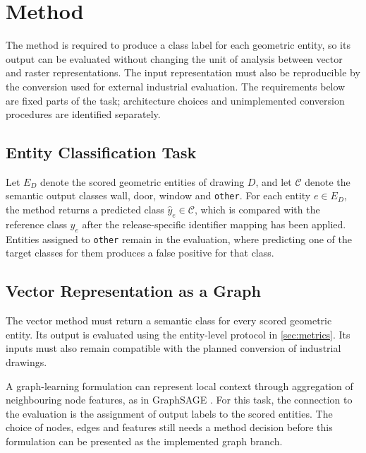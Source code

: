 \chapter{Method}
\label{ch:method}

The method is required to produce a class label for each geometric entity, so its
output can be evaluated without changing the unit of analysis between vector and
raster representations.
The input representation must also be reproducible by the conversion used for
external industrial evaluation.
The requirements below are fixed parts of the task; architecture choices and
unimplemented conversion procedures are identified separately.

\section{Entity Classification Task}
\label{sec:entity-task}
Let \(E_D\) denote the scored geometric entities of drawing \(D\), and let
\(\mathcal{C}\) denote the semantic output classes wall, door, window and
\texttt{other}.
For each entity \(e\in E_D\), the method returns a predicted class
\(\hat y_e\in\mathcal{C}\), which is compared with the reference class \(y_e\)
after the release-specific identifier mapping has been applied.
Entities assigned to \texttt{other} remain in the evaluation, where predicting
one of the target classes for them produces a false positive for that class.

\section{Vector Representation as a Graph}
\label{sec:vector-graph}
The vector method must return a semantic class for every scored geometric entity.
Its output is evaluated using the entity-level protocol in \cref{sec:metrics}.
Its inputs must also remain compatible with the planned conversion of industrial
drawings.

A graph-learning formulation can represent local context through aggregation of
neighbouring node features, as in GraphSAGE \cite{Hamilton2017GraphSAGE}.
For this task, the connection to the evaluation is the assignment of output labels
to the scored entities.
The choice of nodes, edges and features still needs a method decision before this
formulation can be presented as the implemented graph branch.

